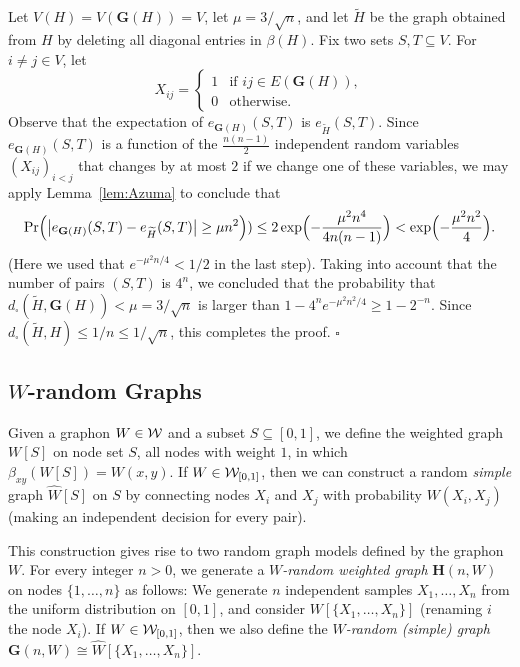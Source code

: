 \documentclass[12pt]{article}
\numberwithin{equation}{section}
\newenvironment{proof}{\medskip\noindent{\bf Proof.
}}{\hfill$\square$\medskip}
\def\iv{\widehat}
\def\bG{{\mathbf G}}
\def\bH{{\mathbf H}}
\def\WWz{{\WW_{[0,1]}}}
\begin{document}
\begin{proof}
Let $V(H)=V(\bG(H))=V$, let $\mu=3/\sqrt n$, and let
$\widetilde H$ be the graph obtained from $H$ by deleting all
diagonal entries in $\beta(H)$. Fix two sets $S,T\subseteq V$. For
$i\neq j\in V$, let
\[
X_{ij}=
  \begin{cases}
    1 & \text{if $ij\in E(\bG(H))$}, \\
    0 & \text{otherwise}.
  \end{cases}
\]
Observe that the expectation of $e_{\bG(H)}(S,T)$ is $e_{\widetilde
H}(S,T)$. Since $e_{\bG(H)}(S,T)$ is a function of the
$\frac{n(n-1)}2$ independent random variables $(X_{ij})_{i< j}$ that
changes by at most $2$ if we change one of these variables, we may
apply Lemma~\ref{lem:Azuma} to conclude that
\[
\Pr\Bigl(\bigl|e_{\bG(H)}(S,T)-e_{\widetilde H}(S,T)\bigr| \geq\mu
n^2\Bigr)) \le 2\exp\Bigl(-\frac{{\mu}^2 n^4}{4n(n-1)}\Bigr) <
\exp\Bigl(-\frac{\mu^2 n^2}4\Bigr).
\]
(Here we used that $e^{-\mu^2 n/4}<1/2$ in the last step).
Taking into account that the number of pairs $(S,T)$ is $4^n$, we
concluded that the probability that $d_\square(\widetilde
H,\bG(H))<\mu=3/\sqrt n$
is larger than $1-4^ne^{-{\mu}^2 n^2/{4}}
\geq 1-2^{-n} $. Since
$d_\square(\widetilde H,H)\leq 1/n\leq 1/\sqrt n$, this
completes the proof.
\end{proof}



\subsection{$W$-random Graphs}

Given a graphon $W\in{\cal W}$ and a subset $S\subseteq [0,1]$, we define
the weighted graph $W[S]$ on node set $S$, all nodes with weight $1$,
in which $\beta_{xy}(W[S])=W(x,y)$. If $W\in\WWz$, then we can
construct a random {\it simple} graph $\iv{W}[S]$ on $S$ by
connecting nodes $X_i$ and $X_j$ with probability $W(X_i,X_j)$
(making an independent decision for every pair).

This construction gives rise to two random graph models defined by
the graphon $W$. For every integer $n>0$, we generate a {\it
{\rm $W$-}random weighted graph} $\bH(n,W)$ on nodes $\{1,\dots,n\}$ as
follows: We generate $n$ independent samples $X_1,\dots,X_n$ from the
uniform distribution on $[0,1]$, and consider $W[\{X_1,\dots,X_n\}]$
(renaming $i$ the node $X_i$). If $W\in\WWz$, then we also define
the {\it {\rm $W$-}random (simple) graph}
$\bG(n,W)\cong\iv{W}[\{X_1,\dots,X_n\}]$.
\end{document}
